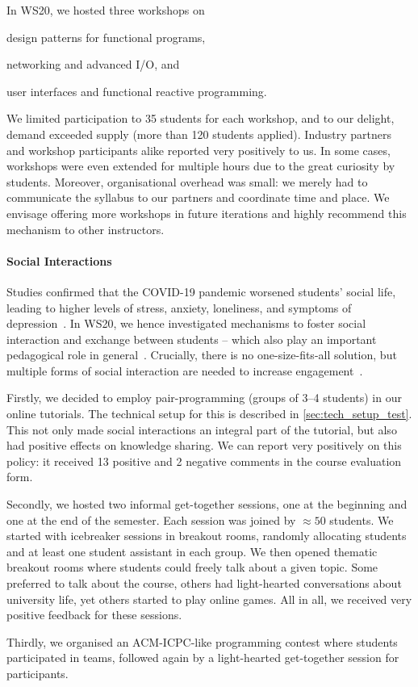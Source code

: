 In WS20,
we hosted three workshops on
\begin{enumerate*}[label=\arabic*)]
  \item design patterns for functional programs,
  \item networking and advanced I/O, and
  \item user interfaces and functional reactive programming.
\end{enumerate*}
We limited participation to 35 students for each workshop,
and to our delight, demand exceeded supply (more than 120 students applied).
Industry partners and workshop participants
alike
reported very positively to us.
In some cases,
workshops were even extended for multiple hours due to the great curiosity by students.
Moreover, organisational overhead was small:
we merely had to communicate the syllabus to our partners and coordinate time and place.
We envisage offering more workshops in future iterations and highly recommend this mechanism to other instructors.

\paragraph{Social Interactions}
Studies confirmed that the COVID-19 pandemic
worsened students' social life,
leading to higher levels of stress, anxiety, loneliness, and symptoms of depression~\cite{students_lockdown1}.
In WS20,
we hence investigated mechanisms
to foster social interaction and exchange between students
-- which also play an important pedagogical role in general~\cite{impact_social_interaction}.
Crucially,
there is no one-size-fits-all solution,
but multiple forms of social interaction
are needed to increase engagement~\cite{onlineengagement3,onlineengagement2}.

Firstly, we decided to employ pair-programming (groups of 3--4 students)
in our online tutorials.
The technical setup for this is described in \cref{sec:tech_setup_test}.
This not only made social interactions an integral part of the tutorial,
but also had positive effects on knowledge sharing.
We can report very positively on this policy:
it received 13 positive and 2 negative comments in the course evaluation form.

Secondly, we hosted two informal get-together sessions,
one at the beginning and one at the end of the semester.
Each session was joined by $\approx 50$ students.
We started with icebreaker sessions in breakout rooms,
randomly allocating students and at least one student assistant in each group.
We then opened thematic breakout rooms where students
could freely talk about a given topic.
Some preferred to talk about the course,
others had light-hearted conversations about university life,
yet others started to play online games.
All in all, we received very positive feedback for these sessions.

Thirdly, we organised an
ACM-ICPC-like programming contest
where students participated in teams,
followed again by a light-hearted get-together session
for participants.

